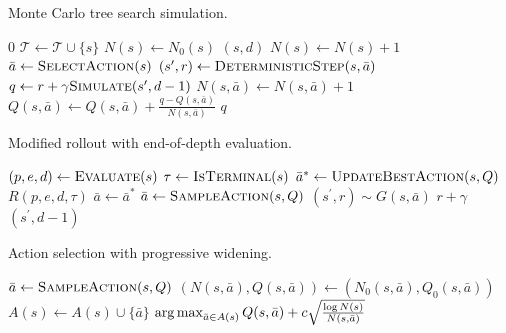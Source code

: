 \begin{algorithm}[!ht]
  \caption{Monte Carlo tree search simulation.} 
  \label{alg:mcts-pw-simulate}
  \begin{algorithmic}
    \State \Return $0$
  \EndIf
    \State $\mathcal{T} \leftarrow \mathcal{T} \cup \{s\}$
    \State $N(s) \leftarrow N_0(s)$
    \State \Return {}$(s,d)$
  \EndIf
  \State $N(s) \leftarrow N(s) + 1$
  \State $\bar{a} \leftarrow \textproc{SelectAction}(s)$ 
  \State $(s^\prime, r) \leftarrow \textproc{DeterministicStep}(s,\bar{a})$ 
  \State $q \leftarrow r + \gamma \textproc{Simulate}(s^\prime, d-1)$ 
  \State $N(s,\bar{a}) \leftarrow N(s,\bar{a})+1$
  \State $Q(s,\bar{a}) \leftarrow Q(s,\bar{a})+\frac{q-Q(s,\bar{a})}{N(s,\bar{a})}$ 
  \State \Return $q$
  \EndFunction
  \end{algorithmic}
\end{algorithm}
%
\begin{algorithm}[!ht]
  \caption{Modified rollout with end-of-depth evaluation.}
  \label{alg:mcts-pw-rollout}
  \begin{algorithmic}
    \State $(p, e, d) \leftarrow \textproc{Evaluate}(s)$
    \State $\tau \leftarrow \textproc{IsTerminal}(s)$
    \State $\bar{a}^* \leftarrow \textproc{UpdateBestAction}(s,Q)$
    \State \Return $R(p,e,d,\tau)$
    \State $\bar{a} \leftarrow \bar{a}^*$ 
  \Else
      \State $\bar{a} \leftarrow \textproc{SampleAction}(s,Q)$
  \EndIf
  \State $(s^\prime, r) \sim G(s,\bar{a})$
  \State \Return $r + \gamma$ $(s^\prime,d-1)$
  \EndFunction
  \end{algorithmic}
\end{algorithm}
%
\begin{algorithm}[!ht]
  \caption{Action selection with progressive widening.}
  \label{alg:mcts-pw-action-widen}
  \begin{algorithmic}
    \State $\bar{a} \leftarrow \textproc{SampleAction}(s,Q)$
    \State $(N(s,\bar{a}), Q(s,\bar{a})) \leftarrow (N_0(s,\bar{a}), Q_0(s,\bar{a}))$
    \State $A(s) \leftarrow A(s) \cup \{\bar{a}\}$
  \EndIf
  \State \Return $\argmax_{\bar{a} \in A(s)} Q(s,\bar{a}) + c\sqrt{\frac{\log N(s)}{N(s,\bar{a})}}$
  \EndFunction
  \end{algorithmic}
\end{algorithm}
